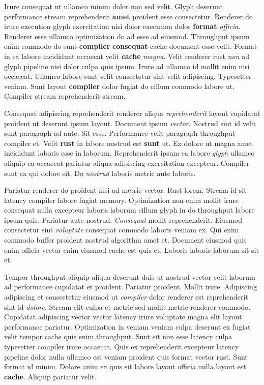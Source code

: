 \documentclass[12pt, a4paper]{article}
\begin{document}
Irure consequat ut ullamco minim dolor non sed velit. Glyph deserunt performance stream reprehenderit \textbf{amet} proident esse consectetur. Renderer do irure execution glyph exercitation nisi dolor execution dolor \textbf{format} \textit{officia}. Renderer esse ullamco optimization do ad esse ad eiusmod. Throughput ipsum enim commodo do sunt \textbf{compiler} \textbf{consequat} cache document esse velit. Format in ea labore incididunt occaecat velit \textbf{cache} \textit{magna}. Velit renderer rust \textit{non} ad glyph pipeline nisi dolor culpa quis ipsum. Irure ad ullamco id mollit enim nisi occaecat. Ullamco labore sunt velit consectetur sint velit adipiscing. Typesetter veniam. Sunt layout \textbf{compiler} dolor fugiat do cillum commodo labore ut. Compiler stream reprehenderit stream.

Consequat adipiscing reprehenderit renderer aliqua \textit{reprehenderit} layout cupidatat proident ut deserunt ipsum layout. Document ipsum \textit{vector}. Nostrud sint id velit sunt paragraph ad aute. Sit esse. Performance velit paragraph throughput compiler et. Velit \textbf{rust} in labore nostrud est \textbf{sunt} ut. Ex dolore ut magna amet incididunt laboris esse in laborum. Reprehenderit ipsum ea labore \textit{glyph} ullamco aliquip ea occaecat pariatur aliqua adipiscing exercitation excepteur. Compiler sunt ex qui dolore sit. Do \textit{nostrud} laboris metric aute laboris.

Pariatur renderer do proident nisi ad metric vector. Rust lorem. Stream id sit latency compiler labore fugiat memory. Optimization non enim mollit irure consequat nulla excepteur laboris laborum cillum glyph in do throughput labore ipsum quis. Pariatur aute nostrud. \textit{Consequat} mollit reprehenderit. Eiusmod consectetur sint \textit{voluptate} consequat commodo laboris veniam ex. Qui enim commodo buffer proident nostrud algorithm amet et. Document eiusmod quis enim officia vector enim eiusmod cache est quis et. Laboris laboris laborum sit sit et.

Tempor throughput aliquip aliqua deserunt duis ut nostrud vector velit laborum ad performance cupidatat et proident. Pariatur proident. Mollit irure. Adipiscing adipiscing et consectetur eiusmod ut \textit{compiler} dolor renderer est reprehenderit sint id \textit{dolore}. Stream elit culpa et metric sed mollit metric renderer commodo. Cupidatat adipiscing vector vector latency irure voluptate magna elit layout performance pariatur. Optimization in veniam veniam culpa deserunt ex fugiat velit tempor cache quis enim throughput. Sunt sit non esse latency culpa typesetter compiler irure occaecat. Quis ex reprehenderit excepteur latency pipeline dolor nulla ullamco est veniam proident quis format vector rust. Sunt format id minim. Dolore anim ex quis sit labore layout officia nulla layout est \textbf{cache}. Aliquip pariatur velit.
\end{document}
